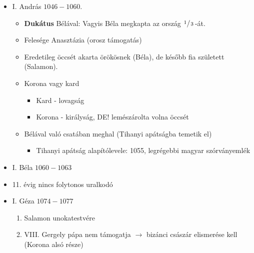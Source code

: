\documentclass{article}
\begin{document}
\begin{itemize}
\begin{itemize}
        \item \textbf{Mártírhalál/Vértanú}: Meghal valamilyen fontos ügyért. A mártír feláldozza magát, a vértanú nem feltétlenül, csak fontos ügyért hal meg. Keresztény kifejezések. 
        
    \end{itemize}
    \item I. András $1046-1060$.
    \begin{itemize}
        \item \textbf{Dukátus} Bélával: Vagyis Béla megkapta az ország $\nicefrac{1\,}{\,3}\,$-át.
        \item Felesége Anasztázia (orosz támogatás)
        \item Eredetileg öccsét akarta örökösnek (Béla), de később fia született (Salamon).
        \item Korona vagy kard 
        \begin{itemize}
            \item Kard - lovagság
            \item Korona - királyság, DE! lemészárolta volna öccsét
        \end{itemize}
        \item Bélával való csatában meghal (Tihanyi apátságba temetik el) 
        \begin{itemize}
            \item Tihanyi apátság alapítólevele: 1055, legrégebbi magyar szórványemlék
        \end{itemize}
    \end{itemize}
    
    \item I. Béla $1060-1063$

    \item 11. évig nincs folytonos uralkodó
    
    \item I. Géza $1074-1077$
    \begin{enumerate}
        \item Salamon unokatestvére
        \item VIII. Gergely pápa nem támogatja $\rightarrow$ bizánci császár elismerése kell (Korona alsó része) 
    \end{enumerate}
    
    
\end{itemize}
\end{document}
